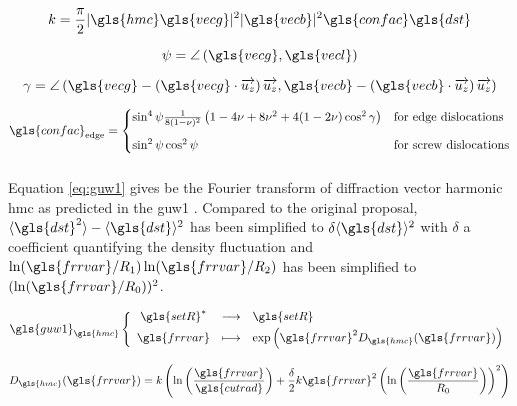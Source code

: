 \begin{equation}
  k =
    \frac{\pi}{2} | \gls{hmc} \gls{vecg} |^2 | \gls{vecb} |^2 \gls{confac} \gls{dst}
\end{equation}

\begin{equation}
  \psi =
    \angle \left( \gls{vecg}, \gls{vecl} \right)
\end{equation}

\begin{equation}
  \gamma = \angle \left(
    \gls{vecg} - \left( \gls{vecg} \cdot \uz \right) \uz,
    \gls{vecb} - \left( \gls{vecb} \cdot \uz \right) \uz
    \right)
\end{equation}

\begin{equation}\label{eq:contrast-factor}
  \gls{confac}_\mathrm{edge} =
    \begin{cases}
      \sin^4 \psi \frac{1}{8(1-\nu)^2} \left( 1 - 4 \nu + 8 \nu^2 + 4 (1 - 2 \nu) \cos^2 \gamma \right)
      & \text{for edge dislocations} \\[3mm]
      \sin^2 \psi \cos^2 \psi
      & \text{for screw dislocations}
    \end{cases}
\end{equation}

\subsubsection{}

Equation \eqref{eq:guw1} gives be the Fourier transform of diffraction vector harmonic \gls{hmc} as predicted in the \gls{guw1} \cite{GUW1988} \cite{SGL2001}.
Compared to the original proposal, \( \langle \gls{dst}^2 \rangle - \langle \gls{dst} \rangle^2 \) has been simplified to \( \delta \langle \gls{dst} \rangle^2 \) with \( \delta \) a coefficient quantifying the density fluctuation and \( \ln(\gls{frrvar}/R_1) \ln(\gls{frrvar}/R_2) \) has been simplified to \( (\ln(\gls{frrvar}/R_0))^2 \).

\begin{equation}
  \define{
    \gls{guw1}_{\gls{hmc}}
  }{
    \gls{setR}^*
  }{
    \gls{setR}
  }{
    \gls{frrvar}
  }{
    \exp\left( \gls{frrvar}^2 D_{\gls{hmc}}(\gls{frrvar}) \right)
  }
  \label{eq:guw1}
\end{equation}

\begin{equation}
  D_{\gls{hmc}}(\gls{frrvar}) =
    k \left( \ln \left( \frac{\gls{frrvar}}{\gls{cutrad}} \right) + \frac{\delta}{2} k \gls{frrvar}^2 \left( \ln\left( \frac{\gls{frrvar}}{R_0} \right) \right)^2 \right)
\end{equation}

